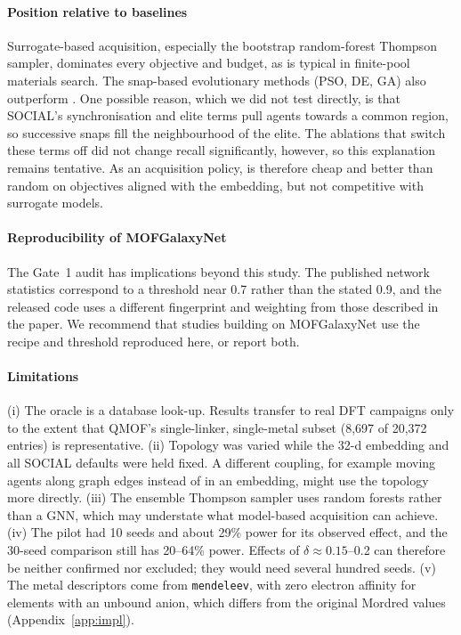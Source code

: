\paragraph{Position relative to baselines}
Surrogate-based acquisition, especially the bootstrap random-forest Thompson sampler, dominates every objective and budget, as is typical in finite-pool materials search. The snap-based evolutionary methods (PSO, DE, GA) also outperform \gs{}. One possible reason, which we did not test directly, is that SOCIAL's synchronisation and elite terms pull agents towards a common region, so successive snaps fill the neighbourhood of the elite. The ablations that switch these terms off did not change recall significantly, however, so this explanation remains tentative. As an acquisition policy, \gs{} is therefore cheap and better than random on objectives aligned with the embedding, but not competitive with surrogate models.

\paragraph{Reproducibility of MOFGalaxyNet}
The Gate~1 audit has implications beyond this study. The published network statistics correspond to a threshold near 0.7 rather than the stated 0.9, and the released code uses a different fingerprint and weighting from those described in the paper. We recommend that studies building on MOFGalaxyNet use the recipe and threshold reproduced here, or report both.

\paragraph{Limitations}
(i) The oracle is a database look-up. Results transfer to real DFT campaigns only to the extent that QMOF's single-linker, single-metal subset (8{,}697 of 20{,}372 entries) is representative. (ii) Topology was varied while the 32-d embedding and all SOCIAL defaults were held fixed. A different coupling, for example moving agents along graph edges instead of in an embedding, might use the topology more directly. (iii) The ensemble Thompson sampler uses random forests rather than a GNN, which may understate what model-based acquisition can achieve. (iv) The pilot had 10 seeds and about 29\% power for its observed effect, and the 30-seed comparison still has 20--64\% power. Effects of $\delta\approx0.15$--0.2 can therefore be neither confirmed nor excluded; they would need several hundred seeds. (v) The metal descriptors come from \texttt{mendeleev}, with zero electron affinity for elements with an unbound anion, which differs from the original Mordred values (Appendix~\ref{app:impl}).
